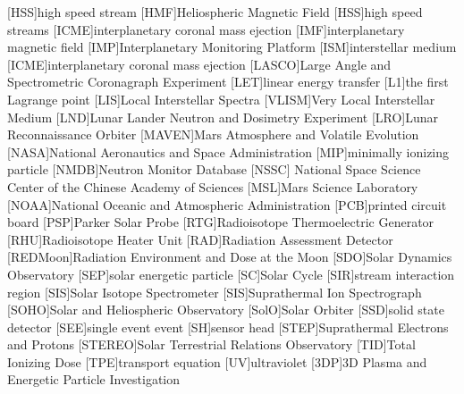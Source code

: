 \begin{acronym}[EUHFORIA\quad]
    [HSS]{high speed stream}
	[HMF]{Heliospheric Magnetic Field}
    [HSS]{high speed streams}
	[ICME]{interplanetary coronal mass ejection}
	[IMF]{interplanetary magnetic field}
	[IMP]{Interplanetary Monitoring Platform}
    [ISM]{interstellar medium}
	[ICME]{interplanetary coronal mass ejection}
    [LASCO]{Large Angle and Spectrometric Coronagraph Experiment}
	[LET]{linear energy transfer}
	[L1]{the first Lagrange point}
	[LIS]{Local Interstellar Spectra}
	[VLISM]{Very Local Interstellar Medium}
	[LND]{Lunar Lander Neutron and Dosimetry Experiment}
	[LRO]{Lunar Reconnaissance Orbiter}
	[MAVEN]{Mars Atmosphere and Volatile Evolution}
	[NASA]{National Aeronautics and Space Administration}
	[MIP]{minimally ionizing particle}
	[NMDB]{Neutron Monitor Database}
	[NSSC]{ National Space Science Center of the Chinese Academy of Sciences}
	[MSL]{Mars Science Laboratory}
    [NOAA]{National Oceanic and Atmospheric Administration}
	[PCB]{printed circuit board}
	[PSP]{Parker Solar Probe}
	[RTG]{Radioisotope Thermoelectric Generator}
	[RHU]{Radioisotope Heater Unit}
	[RAD]{Radiation Assessment Detector}
	[REDMoon]{Radiation Environment and Dose at the Moon}
	[SDO]{Solar Dynamics Observatory}
	[SEP]{solar energetic particle}
	[SC]{Solar Cycle}
	[SIR]{stream interaction region}
	[SIS]{Solar Isotope Spectrometer}
	[SIS]{Suprathermal Ion Spectrograph}
	[SOHO]{Solar and Heliospheric Observatory}
	[SolO]{Solar Orbiter}
	[SSD]{solid state detector}
	[SEE]{single event event}
	[SH]{sensor head}
	[STEP]{Suprathermal Electrons and Protons}
	[STEREO]{Solar Terrestrial Relations Observatory}
	[TID]{Total Ionizing Dose}
	[TPE]{transport equation}
	[UV]{ultraviolet}
	[3DP]{3D Plasma and Energetic Particle Investigation}
	\end{acronym}
	

\endgroup

\cleardoublepage